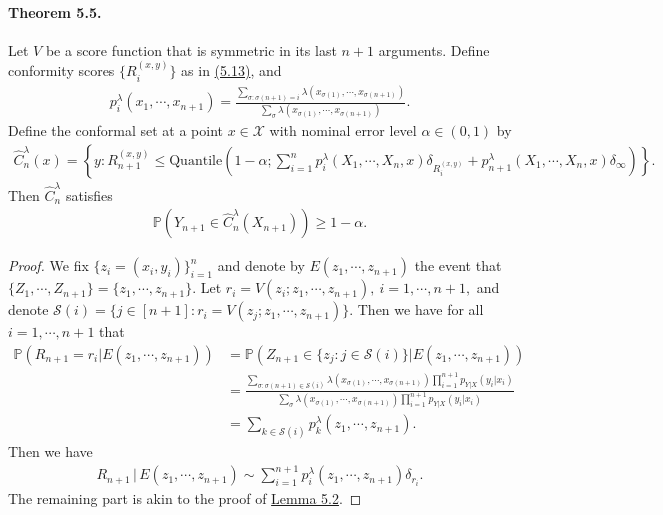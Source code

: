 \documentclass{article}
\numberwithin{equation}{section}
\begin{document}
\paragraph{Theorem 5.5.} Let $V$  be a score function that is symmetric in its last $n+1$ arguments. Define conformity scores $\{R_i^{(x,y)}\}$ as in \hyperref[5.13]{(5.13)}, and
\begin{align*}
	p_i^\lambda(x_1,\cdots,x_{n+1}) = \frac{\sum_{\sigma:\sigma(n+1)=i} \lambda(x_{\sigma(1)},\cdots,x_{\sigma(n+1)})}{\sum_\sigma \lambda(x_{\sigma(1)},\cdots,x_{\sigma(n+1)})}.\tag{5.27}\label{5.27}
\end{align*}
Define the conformal set at a point $x\in\mathcal{X}$ with nominal error level $\alpha\in(0,1)$ by
\begin{align*}
	\widehat{C}_n^\lambda(x) = \left\{y:R_{n+1}^{(x,y)}\leq\mathrm{Quantile}\left(1-\alpha;\sum_{i=1}^n p_i^\lambda(X_1,\cdots,X_n,x)\delta_{R_i^{(x,y)}} + p_{n+1}^\lambda(X_1,\cdots,X_n,x)\delta_\infty\right)\right\}.\tag{5.28}\label{5.28}
\end{align*}
Then $\widehat{C}_n^\lambda$ satisfies
\begin{align*}
	\mathbb{P}\left(Y_{n+1}\in\widehat{C}_n^\lambda(X_{n+1})\right)\geq 1-\alpha.\tag{5.29}\label{5.29}
\end{align*}
\begin{proof}
We fix $\bigl\{z_i=(x_i,y_i)\bigr\}_{i=1}^n$ and denote by $E(z_1,\cdots,z_{n+1})$ the event that $\{Z_1,\cdots,Z_{n+1}\} = \{z_1,\cdots,z_{n+1}\}$. Let $r_i=V(z_i;z_1,\cdots,z_{n+1}),\ i=1,\cdots,n+1,$ and denote $\mathcal{S}(i)=\{j\in[n+1]:r_i=V(z_j;z_1,\cdots,z_{n+1})\}$. Then we have for all $i=1,\cdots,n+1$ that
\begin{align*}
	\mathbb{P}(R_{n+1}=r_i|E(z_1,\cdots,z_{n+1})) &= \mathbb{P}(Z_{n+1}\in\{z_j:j\in\mathcal{S}(i)\}|E(z_1,\cdots,z_{n+1}))\\
	&= \frac{\sum_{\sigma:\sigma(n+1)\in\mathcal{S}(i)}\lambda(x_{\sigma(1)},\cdots,x_{\sigma(n+1)})\prod_{i=1}^{n+1}p_{Y|X}(y_i|x_i)}{\sum_{\sigma}\lambda(x_{\sigma(1)},\cdots,x_{\sigma(n+1)})\prod_{i=1}^{n+1}p_{Y|X}(y_i|x_i)}\\
	&= \sum_{k\in\mathcal{S}(i)} p_k^\lambda(z_1,\cdots,z_{n+1}).\tag{5.30}
\end{align*}
Then we have
\begin{align*}
	R_{n+1}\,|\,E(z_1,\cdots,z_{n+1})\sim\sum_{i=1}^{n+1}p_i^\lambda(z_1,\cdots,z_{n+1})\delta_{r_i}.\tag{5.31}
\end{align*}
The remaining part is akin to the proof of \hyperref[Lemma 5.2]{Lemma 5.2}.
\end{proof}
\end{document}
